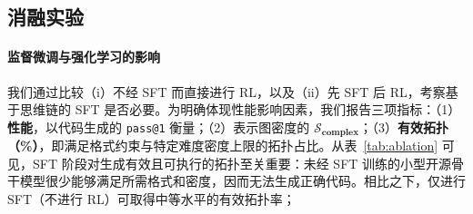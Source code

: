 \documentclass{article}
\theoremstyle{definition}
\begin{document}


\subsection{消融实验}
\label{section:ablation_study}
\paragraph{监督微调与强化学习的影响} 我们通过比较（i）不经 SFT 而直接进行 RL，以及（ii）先 SFT 后 RL，考察基于思维链的 SFT 是否必要。为明确体现性能影响因素，我们报告三项指标：（1）\textbf{性能}，以代码生成的 \texttt{pass@1} 衡量；（2）表示图密度的 $\boldsymbol{\mathcal{S}_{\text{complex}}}$；（3）\textbf{有效拓扑（\%）}，即满足格式约束与特定难度密度上限的拓扑占比。从表~\ref{tab:ablation} 可见，SFT 阶段对生成有效且可执行的拓扑至关重要：未经 SFT 训练的小型开源骨干模型很少能够满足所需格式和密度，因而无法生成正确代码。相比之下，仅进行 SFT（不进行 RL）可取得中等水平的有效拓扑率；
\end{document}
